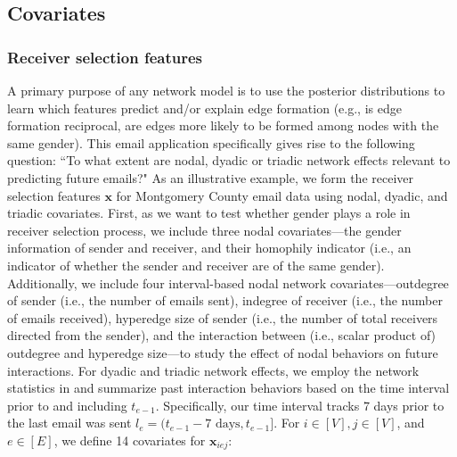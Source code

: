 \documentclass[ba]{imsart}
\numberwithin{equation}{section}
\theoremstyle{plain}
\begin{document}
	\subsection{Covariates}\label{subsec:Covariates_email}
	\subsubsection{Receiver selection features}
	A primary purpose of any network model is to use the posterior distributions to learn which features predict and/or explain edge formation (e.g., is edge formation reciprocal, are edges more likely to be formed among nodes with the same gender). This email application specifically gives rise to the following question: ``To what extent are nodal, dyadic or triadic network effects relevant to predicting future emails?" As an illustrative example, we form the receiver selection features $\boldsymbol{x}$ for Montgomery County email data using nodal, dyadic, and triadic covariates. First, as we want to test whether gender plays a role in receiver selection process, we include three nodal covariates---the gender information of sender and receiver, and their homophily indicator (i.e., an indicator of whether the sender and receiver are of the same gender).  Additionally, we include four interval-based nodal network covariates---outdegree of sender (i.e., the number of emails sent), indegree of receiver (i.e., the number of emails received), hyperedge size of sender (i.e., the number of total receivers directed from the sender), and the interaction between (i.e., scalar product of) outdegree and hyperedge size---to study the effect of nodal behaviors on future interactions. For dyadic and triadic network effects, we employ the network statistics in \cite{PerryWolfe2012} and summarize past interaction behaviors based on the time interval prior to and including $t_{e-1}$. Specifically, our time interval tracks 7 days prior to the last email was sent $l_e= (t_{e-1}-7\mbox{ days}, t_{e-1}]$. For $i \in [V], j\in [V]$, and $e \in [E]$, we define 14 covariates for $\boldsymbol{x}_{iej}$:
\end{document}
